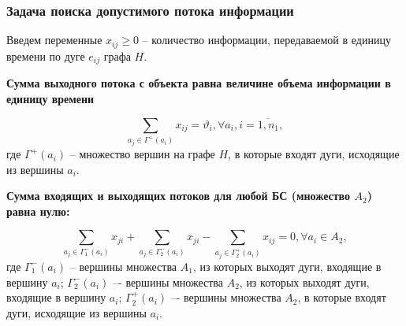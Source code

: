 \begin{frame}
    \frametitle{Задача поиска допустимого потока информации}
    \fontsize{10pt}{5.2}\selectfont
    \justifying


    Введем переменные $x_{ij} \geqslant 0$ -- количество информации, передаваемой в единицу времени по дуге $e_{ij}$ графа $H$.

    \medskip

    \textbf{Сумма выходного потока с объекта равна величине объема информации в единицу времени}

    \begin{equation}\label{eq:part2_1.1}
        \sum_{a_j \in \Gamma^+(a_i)} x_{ij} = \vartheta_i, \forall a_i, i=\overline{1, n_1},
    \end{equation}
    где $\Gamma^+(a_i)$ – множество вершин на графе $H$, в которые входят дуги, исходящие из вершины $a_i$. 

    \bigskip

    \textbf{Сумма входящих и выходящих потоков для любой БС (множество $A_2$) равна нулю:}

    \begin{equation}\label{eq:part2_1.2}
        \sum_{a_j \in \Gamma_1^-(a_i)} x_{ji} + \sum_{a_j \in \Gamma_2^-(a_i)} x_{ji} -  \sum_{a_j \in \Gamma_2^+(a_i)} x_{ij} =0 ,\forall a_i \in A_2,
    \end{equation}
    где $\Gamma_1^-(a_i)$ -- вершины множества $A_1$, из которых выходят дуги, входящие в вершину $a_i$; $\Gamma_2^-(a_i)$ –- вершины множества $A_2$, из которых выходят дуги, входящие в  вершину $a_i$; $\Gamma_2^+(a_i)$ –- вершины множества $A_2$, в которые входят дуги, исходящие из вершины $a_i$.
   

\end{frame}


